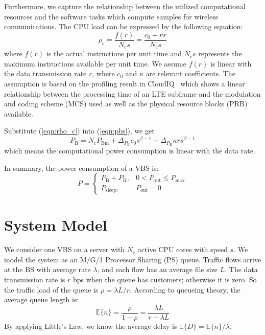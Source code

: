 \documentclass[conference]{IEEEtran}
\newcommand{\E}[1]{\mathbb{E}\{#1\}}
\begin{document}
Furthermore, we capture the relationship between the utilized computational
resources and the software tasks which compute samples for wireless
communications.
The CPU load can be expressed by the following equation:
\begin{equation}
  \rho_\text{c} = \frac{f(r)}{N_\text{c} s} = \frac{c_0+\kappa r}{N_\text{c} s}
  \label{eqn:rho_c}
\end{equation}
where $f(r)$ is the actual instructions per unit
time and $N_\text{c} s$ represents the maximum instructions available per unit time.
We assume $f(r)$ is linear with the data transmission rate $r$, where
$c_0$ and $\kappa$ are relevant coefficients.
The assumption is based on the profiling result
in CloudIQ~\cite{bhaumik2012cloudiq} which shows
a linear relationship between
the processing time of an LTE subframe and the modulation and coding scheme (MCS)
used as well as the physical resource blocks (PRB) available.

Substitute (\ref{eqn:rho_c}) into (\ref{eqn:pbs}), we get
\begin{equation}
  P_\text{B} = N_\text{c} P_\text{Bm} + \Delta_{P_\text{B}}c_0s^{\beta - 1} +
  \Delta_{P_\text{B}} \kappa r s^{\beta - 1}
  \label{eqn:bbu-power-s}
\end{equation}
which means the computational power consumption is linear with the data rate.

In summary, the power consumption of a VBS is:
\begin{equation}
  P = \begin{cases}
    P_\text{B} +  P_\text{R}, & 0 < P_\text{out} \le P_\text{max}\\
    P_\text{sleep}, & P_\text{out} = 0
  \end{cases}
  \label{eqn:model}
\end{equation}

\section{System Model}
\label{sec:sysmodel}

We consider one VBS on a server with $N_\text{c}$ active CPU cores with speed $s$.
We model the system as an M/G/1 Processor Sharing (PS) queue.
Traffic flows arrive at the BS with average rate $\lambda$, and each flow has
an average file size $L$.
The data transmission rate is $r$ \si{bps} when the queue has customers;
otherwise it is zero.
So the traffic load of the queue is $\rho = \lambda L / r $.
According to queueing theory, the average queue length is:
\begin{equation}
  \E{n} = \frac{\rho}{1-\rho} = \frac{\lambda L}{r - \lambda L}
  \label{eqn:En}
\end{equation}
By applying Little's Law, we know the average delay is $\E{D} = \E{n} / \lambda$.
\end{document}
